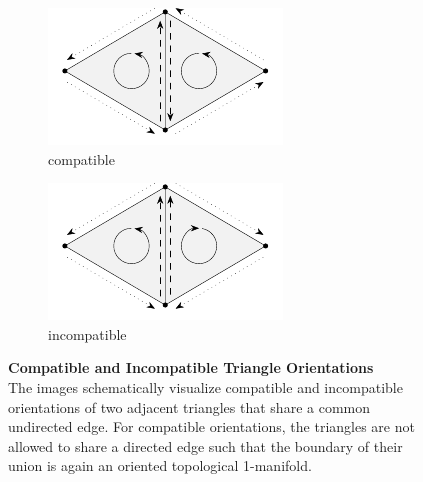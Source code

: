 \documentclass{stdlocal}
\begin{document}
  \begin{figure}[t]
    \centering
    \begin{subfigure}[b]{0.49\linewidth}
      \centering
      \includegraphics[width=0.8\linewidth]{figures/compatible-triangle-orientations.pdf}
      \caption{compatible}
    \end{subfigure}
    \hfill
    \begin{subfigure}[b]{0.49\linewidth}
      \centering
      \includegraphics[width=0.8\linewidth]{figures/incompatible-triangle-orientations.pdf}
      \caption{incompatible}
    \end{subfigure}
    \caption[Compatible and Incompatible Triangle Orientations]{%
      \textbf{Compatible and Incompatible Triangle Orientations}\\
      The images schematically visualize compatible and incompatible orientations of two adjacent triangles that share a common undirected edge.
      For compatible orientations, the triangles are not allowed to share a directed edge such that the boundary of their union is again an oriented topological 1-manifold.
    }
    \label{fig:compatible-triangle-orientations}
  \end{figure}
\end{document}
